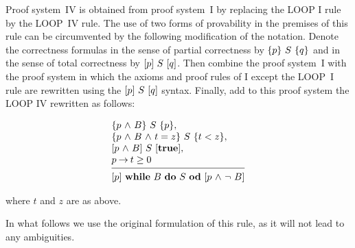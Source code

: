 \documentclass[manuscript, screen, review]{acmart}
\begin{document}
Proof system~IV is obtained from proof system~I by replacing the LOOP
I rule by the LOOP~IV rule. The use of two forms of provability in the
premises of this rule can be circumvented by the following
modification of the notation.  Denote the correctness
formulas in the sense of partial correctness by $\mbox{$\{{p}\}\ {S}\ \{{q}\}$}$ and in
the sense of total correctness by $[{p}]\ {S}\ [{q}]$. Then combine the
proof system~I with the proof system in which the axioms and proof
rules of I except the LOOP~I rule are rewritten using the
$[{p}]\ {S}\ [{q}]$ syntax. Finally, add to this proof system the LOOP IV
rewritten as follows:
\III

\[
 \begin{array}{l}
  \HT{p \A B}{S}{p},                      \\
  \HT{p \A B \A t=z}{S}{t<z},             \\
  \HTT{p \A B}{S}{\mathbf{true}},         \\
  p \ra t \geq 0                         \\
  [-\medskipamount]
  \hrulefill                              \\
  \HTT{p}{\WDD{B}{S}}{p \A \neg\ B}
 \end{array}
\]

\NI
where $t$ and $z$ are as above.
\III

In what follows we use the original formulation of this rule, 
as it will not lead to any ambiguities.





\end{document}

